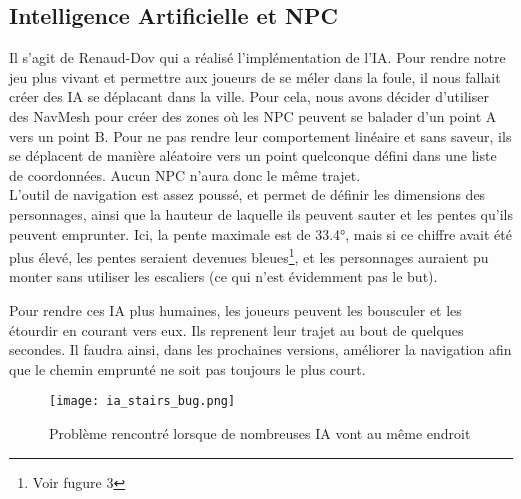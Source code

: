 \subsection{Intelligence Artificielle et NPC}
Il s'agit de Renaud-Dov qui a réalisé l'implémentation de l'IA.
Pour rendre notre jeu plus vivant et permettre aux joueurs de se méler dans la foule,
il nous fallait créer des IA se déplacant dans la ville.
Pour cela, nous avons décider d'utiliser des NavMesh pour créer des zones où les 
NPC peuvent se balader d'un point A vers un point B.
Pour ne pas rendre leur comportement linéaire et sans saveur,
ils se déplacent de manière aléatoire  vers un point quelconque défini dans une liste de coordonnées.
Aucun NPC n'aura donc le même trajet.\\

L’outil de navigation est assez poussé, et permet de définir les dimensions des personnages,
ainsi que la hauteur de laquelle ils peuvent sauter et les pentes qu’ils peuvent emprunter.
Ici, la pente maximale est de 33.4°, mais si ce chiffre avait été plus élevé,
les pentes seraient devenues bleues\footnote{Voir fugure 3}, et les personnages auraient pu
monter sans utiliser les escaliers (ce qui n’est évidemment pas le but).


Pour rendre ces IA plus humaines, les joueurs peuvent les bousculer et les étourdir en courant vers eux.
Ils reprenent leur trajet au bout de quelques secondes. Il faudra ainsi, dans les prochaines versions, améliorer la navigation afin que le chemin emprunté ne soit pas toujours le plus court. 
\newline

\begin{figure}[h!]
        \centering
        \texttt{[image: ia\_stairs\_bug.png]}
        \caption{Problème rencontré lorsque de nombreuses IA vont au même endroit}
\end{figure}